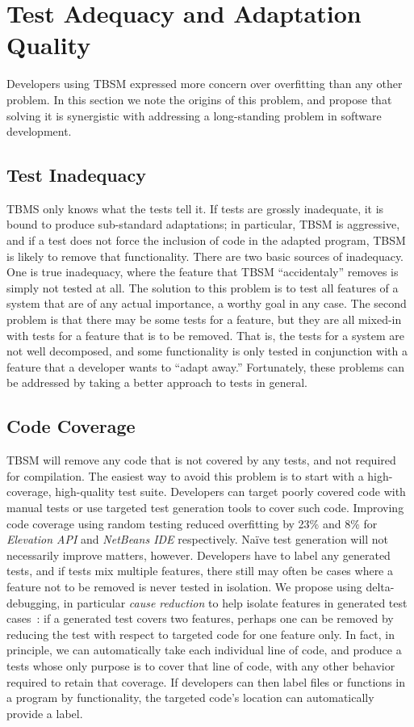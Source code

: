\section{Test Adequacy and Adaptation Quality}
Developers using TBSM expressed more concern over overfitting than any other problem.  In this section we note the origins of this problem, and propose that solving it is synergistic with addressing a long-standing problem in software development.

\subsection{Test Inadequacy}

TBMS only knows what the tests tell it.  If tests are grossly inadequate, it is bound to produce sub-standard adaptations; in particular, TBSM is aggressive, and if a test does not force the inclusion of code in the adapted program, TBSM is likely to remove that functionality.  There are two basic sources of inadequacy.  One is true inadequacy, where the feature that TBSM ``accidentaly'' removes is simply not tested at all.  The solution to this problem is to test all features of a system that are of any actual importance, a worthy goal in any case.  The second problem is that there may be some tests for a feature, but they are all mixed-in with tests for a feature that is to be removed.  That is, the tests for a system are not well decomposed, and some functionality is only tested in conjunction with a feature that a developer wants to ``adapt away.''  Fortunately, these problems can be addressed by taking a better approach to tests in general.

\subsection{Code Coverage} 
TBSM will remove any code that is not covered by any tests, and not required for compilation. The easiest way to avoid this problem is to start with a high-coverage, high-quality test suite. Developers can target poorly covered code with manual tests or use targeted test generation tools to cover such code. Improving code coverage using random testing reduced overfitting by 23\% and 8\% for \textit{Elevation API} and \textit{NetBeans IDE} respectively. Na\"ive test generation will not necessarily improve matters, however. Developers have to label any generated tests, and if tests mix multiple features, there still may often be cases where a feature not to be removed is never tested in isolation. We propose using delta-debugging, in particular \emph{cause reduction} to help isolate features in generated test cases~\cite{stvrcausereduce}: if a generated test covers two features, perhaps one can be removed by reducing the test with respect to targeted code for one feature only.  In fact, in principle, we can automatically take each individual line of code, and produce a tests whose only purpose is to cover that line of code, with any other behavior required to retain that coverage.  If developers can then label files or functions in a program by functionality, the targeted code's location can automatically provide a label.


